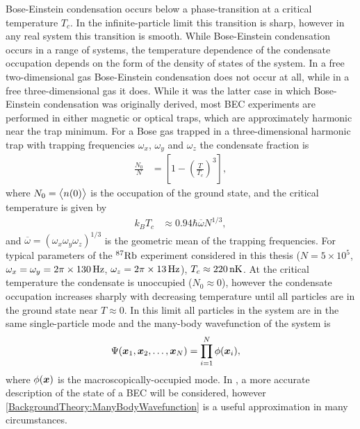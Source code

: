 Bose-Einstein condensation occurs below a phase-transition at a critical temperature $T_c$.  In the infinite-particle limit this transition is sharp, however in any real system this transition is smooth.  While Bose-Einstein condensation occurs in a range of systems, the temperature dependence of the condensate occupation depends on the form of the density of states of the system.  In a free two-dimensional gas Bose-Einstein condensation does not occur at all, while in a free three-dimensional gas it does.  While it was the latter case in which Bose-Einstein condensation was originally derived, most BEC experiments are performed in either magnetic or optical traps, which are approximately harmonic near the trap minimum.  For a Bose gas trapped in a three-dimensional harmonic trap with trapping frequencies $\omega_x$, $\omega_y$ and $\omega_z$ the condensate fraction is \citep{PethickSmith}
\begin{align}
    \frac{N_0}{N} &= \left[1 - \left(\frac{T}{T_c}\right)^{3} \right], \label{BackgroundTheory:CondensateFractionHarmonicTrap}
\end{align}
where $N_0 = {\big<n(0)\big>}$ is the occupation of the ground state, and the critical temperature is given by
\begin{align}
    k_B T_c &\approx 0.94 \hbar \overline{\omega} N^{1/3}, \label{BackgroundTheory:HarmonicTrapCriticalTemperature}
\end{align}
and $\overline{\omega}=(\omega_x \omega_y \omega_z)^{1/3}$ is the geometric mean of the trapping frequencies.  For typical parameters of the $^{87}\text{Rb}$ experiment considered in this thesis ($N = 5\times 10^5$, $\omega_x = \omega_y = 2 \pi \times \unit[130]{Hz}$, $\omega_z = 2 \pi \times \unit[13]{Hz}$), $T_c \approx \unit[220]{nK}$.  At the critical temperature the condensate is unoccupied ($N_0 \approx 0$), however the condensate occupation increases sharply with decreasing temperature until all particles are in the ground state near $T \approx 0$.  In this limit all particles in the system are in the same single-particle mode and the many-body wavefunction of the system is
\begin{align}
    \Psi(\vect{x}_1, \vect{x}_2, \dots, \vect{x}_N) &= \prod_{i=1}^{N} \phi(\vect{x}_i), \label{BackgroundTheory:ManyBodyWavefunction}
\end{align}
where $\phi(\bm{x})$ is the macroscopically-occupied mode.  In , a more accurate description of the state of a BEC will be considered, however \eqref{BackgroundTheory:ManyBodyWavefunction} is a useful approximation in many circumstances.

